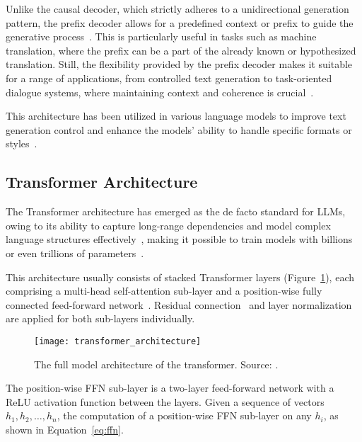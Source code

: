 Unlike the causal decoder, which strictly adheres to a unidirectional generation pattern, the prefix decoder allows for a predefined context or prefix to guide the generative process~\cite{li2021prefixtuning}.
This is particularly useful in tasks such as machine translation, where the prefix can be a part of the already known or hypothesized translation.
Still, the flexibility provided by the prefix decoder makes it suitable for a range of applications, from controlled text generation to task-oriented dialogue systems, where maintaining context and coherence is crucial~\cite{li2022ptuning}.

This architecture has been utilized in various language models to improve text generation control and enhance the models' ability to handle specific formats or styles~\cite{raffel2023exploring}.

\subsection{Transformer Architecture}
\label{subsec:transformer-architecture}

The Transformer architecture has emerged as the de facto standard for LLMs, owing to its ability to capture long-range dependencies and model complex language structures effectively~\cite{vaswani2023attention}, making it possible to train models with billions or even trillions of parameters~\cite{brown2020language, touvron2023llama}.

This architecture usually consists of stacked Transformer layers (Figure~\ref{fig:architecture}), each comprising a multi-head self-attention sub-layer and a position-wise fully connected feed-forward network~\cite{vaswani2023attention}.
Residual connection~\cite{he2016deep} and layer normalization~\cite{ba2016layer} are applied for both sub-layers individually.

\begin{figure}[H]
	\centering
	\texttt{[image: transformer\_architecture]}
	\caption{The full model architecture of the transformer. Source: \textcite{weng2018attention}.}
	\label{fig:architecture}
\end{figure}

The position-wise FFN sub-layer is a two-layer feed-forward network with a ReLU activation function between the layers.
Given a sequence of vectors \(h_1, h_2, \ldots, h_n\), the computation of a position-wise FFN sub-layer on any \(h_i\), as shown in Equation~\ref{eq:ffn}.

